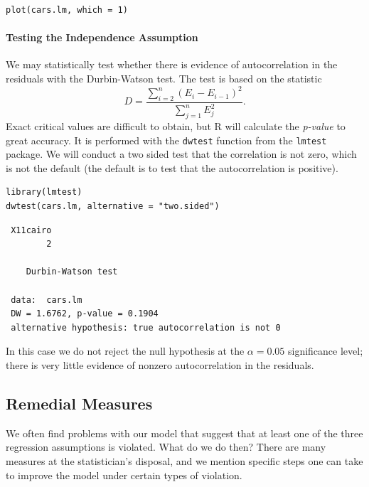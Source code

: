 \documentclass[captions=tableheading]{scrbook}
\begin{document}
\begin{verbatim}
plot(cars.lm, which = 1)
\end{verbatim}





\paragraph*{Testing the Independence Assumption}

We may statistically test whether there is evidence of autocorrelation in the residuals with the Durbin-Watson test. The test is based on the statistic
\begin{equation}
D=\frac{\sum_{i=2}^{n}(E_{i}-E_{i-1})^{2}}{\sum_{j=1}^{n}E_{j}^{2}}.
\end{equation}
Exact critical values are difficult to obtain, but \textsf{R} will calculate the \emph{p-value} to great accuracy. It is performed with the \texttt{dwtest} function from the \texttt{lmtest} package. We will conduct a two sided test that the correlation is not zero, which is not the default (the default is to test that the autocorrelation is positive).


\begin{verbatim}
library(lmtest)
dwtest(cars.lm, alternative = "two.sided")
\end{verbatim}

\begin{verbatim}
 X11cairo 
        2
  
 	Durbin-Watson test
 
 data:  cars.lm 
 DW = 1.6762, p-value = 0.1904
 alternative hypothesis: true autocorrelation is not 0
\end{verbatim}

In this case we do not reject the null hypothesis at the \(\alpha=0.05\) significance level; there is very little evidence of nonzero autocorrelation in the residuals.
\subsection{Remedial Measures}
\label{sec-11-4-4}


We often find problems with our model that suggest that at least one of the three regression assumptions is violated. What do we do then? There are many measures at the statistician's disposal, and we mention specific steps one can take to improve the model under certain types of violation.
\end{document}

